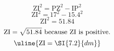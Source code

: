 \[\text{ZI}^{2}=\text{PZ}^{2}-\text{IP}^{2}\]
\[\text{ZI}^{2}=17^{2}-15.4^{2}\]
\[\text{ZI}^{2}=51.84\]
\[\text{ZI}=\sqrt{\mathstrut 51.84}\text{ because ZI is positive.}\]
\[\uline{\text{ZI}=\SI{7.2}{dm}}\]
